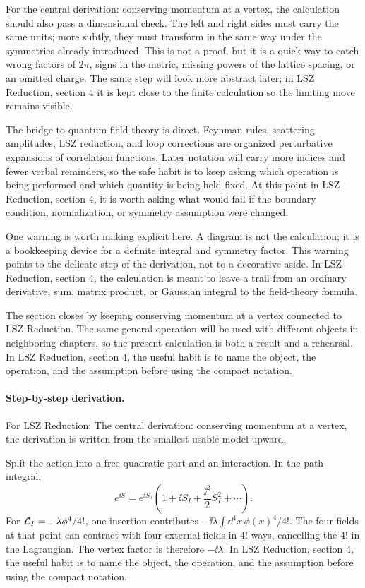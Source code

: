 For the central derivation: conserving momentum at a vertex, the calculation should also pass a dimensional check.  The left and right sides must carry the same units; more subtly, they must transform in the same way under the symmetries already introduced.  This is not a proof, but it is a quick way to catch wrong factors of \(2\pi\), signs in the metric, missing powers of the lattice spacing, or an omitted charge.  The same step will look more abstract later; in LSZ Reduction, section 4 it is kept close to the finite calculation so the limiting move remains visible.

The bridge to quantum field theory is direct.  Feynman rules, scattering amplitudes, LSZ reduction, and loop corrections are organized perturbative expansions of correlation functions.  Later notation will carry more indices and fewer verbal reminders, so the safe habit is to keep asking which operation is being performed and which quantity is being held fixed.  At this point in LSZ Reduction, section 4, it is worth asking what would fail if the boundary condition, normalization, or symmetry assumption were changed.

One warning is worth making explicit here.  A diagram is not the calculation; it is a bookkeeping device for a definite integral and symmetry factor.  This warning points to the delicate step of the derivation, not to a decorative aside.  In LSZ Reduction, section 4, the calculation is meant to leave a trail from an ordinary derivative, sum, matrix product, or Gaussian integral to the field-theory formula.

The section closes by keeping conserving momentum at a vertex connected to LSZ Reduction.  The same general operation will be used with different objects in neighboring chapters, so the present calculation is both a result and a rehearsal.  In LSZ Reduction, section 4, the useful habit is to name the object, the operation, and the assumption before using the compact notation.



\paragraph{Step-by-step derivation.}

For LSZ Reduction: The central derivation: conserving momentum at a vertex, the derivation is written from the smallest usable model upward.

Split the action into a free quadratic part and an interaction.  In the path integral,
\[
  e^{\ii S}=e^{\ii S_0}\left(1+\ii S_I+\frac{\ii^2}{2}S_I^2+\cdots\right).
\]
For \(\mathcal L_I=-\lambda\phi^4/4!\), one insertion contributes \(-\ii\lambda\int\dd^4x\,\phi(x)^4/4!\).  The four fields at that point can contract with four external fields in \(4!\) ways, cancelling the \(4!\) in the Lagrangian.  The vertex factor is therefore \(-\ii\lambda\).  In LSZ Reduction, section 4, the useful habit is to name the object, the operation, and the assumption before using the compact notation.

